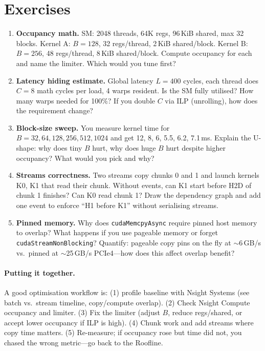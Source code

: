 \section{Exercises}
\label{sec:ch04-exercises}
\begin{enumerate}[label=E4.\arabic*, leftmargin=*, itemsep=0.6em]
    \item \textbf{Occupancy math.} SM: 2048 threads, 64K regs, 96\,KiB shared, max 32 blocks. Kernel A: $B=128$, 32 regs/thread, 2\,KiB shared/block. Kernel B: $B=256$, 48 regs/thread, 8\,KiB shared/block. Compute occupancy for each and name the limiter. Which would you tune first?
    \item \textbf{Latency hiding estimate.} Global latency $L=400$ cycles, each thread does $C=8$ math cycles per load, 4 warps resident. Is the SM fully utilised? How many warps needed for 100\%? If you double $C$ via ILP (unrolling), how does the requirement change?
    \item \textbf{Block-size sweep.} You measure kernel time for $B=32,64,128,256,512,1024$ and get 12, 8, 6, 5.5, 6.2, 7.1\,ms. Explain the U-shape: why does tiny $B$ hurt, why does huge $B$ hurt despite higher occupancy? What would you pick and why?
    \item \textbf{Streams correctness.} Two streams copy chunks 0 and 1 and launch kernels K0, K1 that read their chunk. Without events, can K1 start before H2D of chunk 1 finishes? Can K0 read chunk 1? Draw the dependency graph and add one event to enforce ``H1 before K1'' without serialising streams.
    \item \textbf{Pinned memory.} Why does \texttt{cudaMemcpyAsync} require pinned host memory to overlap? What happens if you use pageable memory or forget \texttt{cudaStreamNonBlocking}? Quantify: pageable copy pins on the fly at $\sim$6\,GB/s vs.\ pinned at $\sim$25\,GB/s PCIe4---how does this affect overlap benefit?
\end{enumerate}

\paragraph{Putting it together.} A good optimisation workflow is: (1) profile baseline with Nsight Systems (see batch vs.\ stream timeline, copy/compute overlap). (2) Check Nsight Compute occupancy and limiter. (3) Fix the limiter (adjust $B$, reduce regs/shared, or accept lower occupancy if ILP is high). (4) Chunk work and add streams where copy time matters. (5) Re-measure; if occupancy rose but time did not, you chased the wrong metric---go back to the Roofline.

